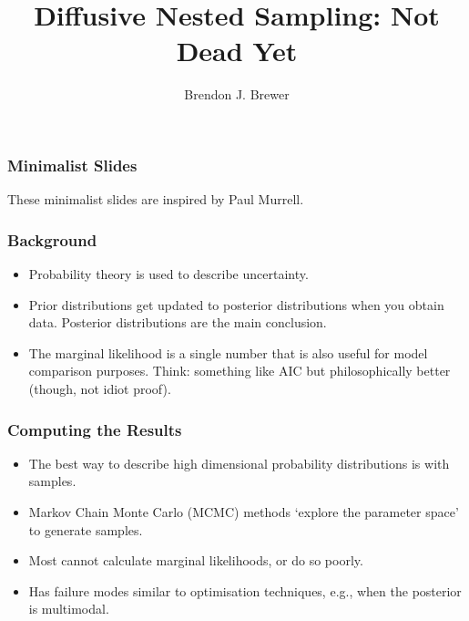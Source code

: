 \documentclass{beamer}
\author{Brendon J. Brewer}
\title{Diffusive Nested Sampling: Not Dead Yet}
\institute{The University of Auckland}
\date{}
\begin{document}
\frame{\titlepage}


\begin{frame}
\frametitle{Minimalist Slides}
These minimalist slides are inspired by Paul Murrell.

\end{frame}






\begin{frame}
\frametitle{Background}

\begin{itemize}
\item Probability theory is used to describe uncertainty.\pause
\item Prior distributions get updated to posterior distributions when you
obtain data. Posterior distributions are the main
conclusion.\pause
\item The marginal likelihood is a single number that is also useful
for model comparison purposes. Think: something like AIC but philosophically
better (though, not idiot proof).
\end{itemize}

\end{frame}


\begin{frame}
\frametitle{Computing the Results}
\begin{itemize}
\item The best way to describe high dimensional probability distributions
is with samples.\pause
\item Markov Chain Monte Carlo (MCMC) methods `explore the parameter space'
to generate samples.\pause
\item Most cannot calculate marginal likelihoods, or do so poorly.\pause
\item Has failure modes similar to optimisation techniques, e.g., when
the posterior is multimodal.
\end{itemize}


\end{frame}
\end{document}
